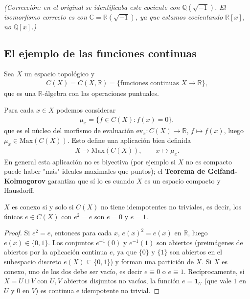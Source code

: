 \emph{(Corrección: en el original se identificaba este cociente con $\mathbb{Q}(\sqrt{-1})$. El isomorfismo correcto es con $\mathbb{C}=\mathbb{R}(\sqrt{-1})$, ya que estamos cocientando $\mathbb{R}[x]$, no $\mathbb{Q}[x]$.)}

\subsection{El ejemplo de las funciones continuas}

Sea $X$ un espacio topológico y
\begin{gather*}
    C(X) = C(X,\mathbb{R}) = \{\text{funciones continuas } X\to \mathbb{R}\},
\end{gather*}
que es una $\mathbb{R}$-álgebra con las operaciones puntuales.

Para cada $x\in X$ podemos considerar
\begin{gather*}
    \mu_x = \{f \in C(X) : f(x)=0\},
\end{gather*}
que es el núcleo del morfismo de evaluación $\mathrm{ev}_x: C(X)\to \mathbb{R}$, $f\mapsto f(x)$, luego $\mu_x \in \mathrm{Max}(C(X))$. Esto define una aplicación bien definida
\begin{gather*}
    X \to \mathrm{Max}(C(X)), \qquad x \mapsto \mu_x.
\end{gather*}
En general esta aplicación no es biyectiva (por ejemplo si $X$ no es compacto puede haber "más" ideales maximales que puntos); el \textbf{Teorema de Gelfand-Kolmogorov} garantiza que sí lo es cuando $X$ es un espacio compacto y Hausdorff.

\begin{prop}
$X$ es conexo si y solo si $C(X)$ no tiene idempotentes no triviales, es decir, los únicos $e\in C(X)$ con $e^2=e$ son $e=0$ y $e=1$.
\end{prop}
\begin{proof}
Si $e^2=e$, entonces para cada $x$, $e(x)^2=e(x)$ en $\mathbb{R}$, luego $e(x)\in\{0,1\}$. Los conjuntos $e^{-1}(0)$ y $e^{-1}(1)$ son abiertos (preimágenes de abiertos por la aplicación continua $e$, ya que $\{0\}$ y $\{1\}$ son abiertos en el subespacio discreto $e(X)\subseteq\{0,1\}$) y forman una partición de $X$. Si $X$ es conexo, uno de los dos debe ser vacío, es decir $e\equiv 0$ o $e\equiv 1$. Recíprocamente, si $X=U\sqcup V$ con $U,V$ abiertos disjuntos no vacíos, la función $e=\mathbf 1_U$ (que vale $1$ en $U$ y $0$ en $V$) es continua e idempotente no trivial.
\end{proof}

